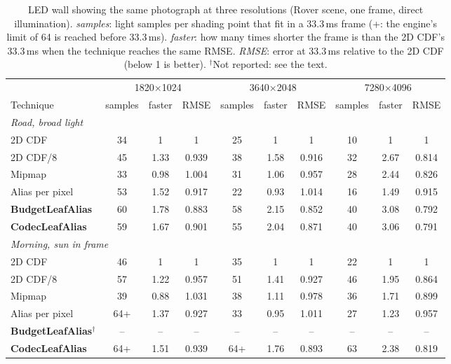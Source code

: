 \begin{table}[H]
\centering\small
\setlength{\tabcolsep}{4pt}
\caption{LED wall showing the same photograph at three resolutions (Rover scene, one frame, direct illumination). \emph{samples}: light samples per shading point that fit in a 33.3\,ms frame (+: the engine's limit of 64 is reached before 33.3\,ms). \emph{faster}: how many times shorter the frame is than the 2D CDF's 33.3\,ms when the technique reaches the same RMSE. \emph{RMSE}: error at 33.3\,ms relative to the 2D CDF (below 1 is better). $^\dagger$Not reported: see the text.}
\label{tab:wall}
\begin{tabular}{l ccc ccc ccc}
\toprule
 & \multicolumn{3}{c}{1820$\times$1024} & \multicolumn{3}{c}{3640$\times$2048} & \multicolumn{3}{c}{7280$\times$4096} \\
\cmidrule(lr){2-4}\cmidrule(lr){5-7}\cmidrule(lr){8-10}
Technique & samples & faster & RMSE & samples & faster & RMSE & samples & faster & RMSE \\
\midrule
\multicolumn{10}{l}{\textit{Road, broad light}} \\
2D CDF & 34 & 1 & 1 & 25 & 1 & 1 & 10 & 1 & 1 \\
2D CDF/8 & 45 & 1.33 & 0.939 & 38 & 1.58 & 0.916 & 32 & 2.67 & 0.814 \\
Mipmap & 33 & 0.98 & 1.004 & 31 & 1.06 & 0.957 & 28 & 2.44 & 0.826 \\
Alias per pixel & 53 & 1.52 & 0.917 & 22 & 0.93 & 1.014 & 16 & 1.49 & 0.915 \\
\textbf{BudgetLeafAlias} & 60 & 1.78 & 0.883 & 58 & 2.15 & 0.852 & 40 & 3.08 & 0.792 \\
\textbf{CodecLeafAlias} & 59 & 1.67 & 0.901 & 55 & 2.04 & 0.871 & 40 & 3.06 & 0.791 \\
\midrule
\multicolumn{10}{l}{\textit{Morning, sun in frame}} \\
2D CDF & 46 & 1 & 1 & 35 & 1 & 1 & 22 & 1 & 1 \\
2D CDF/8 & 57 & 1.22 & 0.957 & 51 & 1.41 & 0.927 & 46 & 1.95 & 0.864 \\
Mipmap & 39 & 0.88 & 1.031 & 38 & 1.11 & 0.978 & 36 & 1.71 & 0.899 \\
Alias per pixel & 64+ & 1.37 & 0.927 & 33 & 0.95 & 1.011 & 27 & 1.23 & 0.957 \\
\textbf{BudgetLeafAlias}$^\dagger$ & -- & -- & -- & -- & -- & -- & -- & -- & -- \\
\textbf{CodecLeafAlias} & 64+ & 1.51 & 0.939 & 64+ & 1.76 & 0.893 & 63 & 2.38 & 0.819 \\
\bottomrule
\end{tabular}
\end{table}
